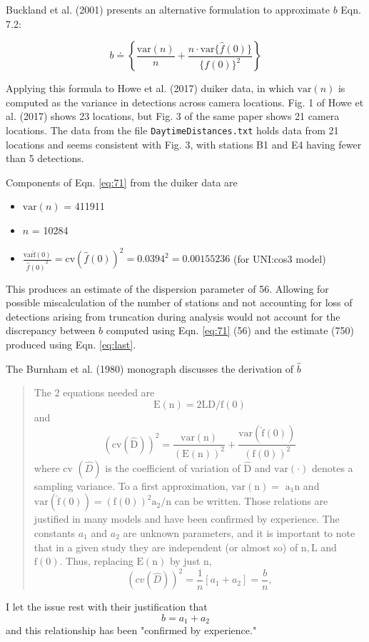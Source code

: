 \documentclass[10pt,a4paper]{article}
\begin{document}
Buckland et al. (2001) presents an alternative formulation to approximate $b$ Eqn. 7.2:

\begin{equation}
\label{eq:71}
b \doteq\left\{\frac{\mathrm{var}(n)}{n}+\frac{n \cdot \mathrm{var}\{\hat{f}(0)\}}{\{f(0)\}^{2}}\right\}
\end{equation}

Applying this formula to Howe et al. (2017) duiker data, in which $\mathrm{var}(n)$ is computed as the variance in detections across camera locations.  Fig. 1 of Howe et al. (2017) shows 23 locations, but Fig. 3 of the same paper shows 21 camera locations.  The data from the file \texttt{DaytimeDistances.txt} holds data from 21 locations and seems consistent with Fig. 3, with stations B1 and E4 having fewer than 5 detections.

Components of Eqn. \ref{eq:71} from the duiker data are
\begin{itemize}
	\item $\mathrm{var}(n)$ = 411911
	\item $n$ = 10284
	\item $\frac{\mathrm{var{\hat{f}(0)}}}{{\hat{f}(0)}^2} = \mathrm{cv}(\hat{f}(0))^2 = 0.0394^2 = 0.00155236$ (for UNI:cos3 model)
\end{itemize}

This produces an estimate of the dispersion parameter of 56.  Allowing for possible miscalculation of the number of stations and not accounting for loss of detections arising from truncation during analysis would not account for the discrepancy between $\hat{b}$ computed using Eqn. \ref{eq:71} (56) and the estimate (750) produced using Eqn. \ref{eq:last}.

The Burnham et al. (1980) monograph discusses the derivation of $\hat{b}$

\begin{quotation}
The 2 equations needed are
$$
\mathrm{E}(\mathrm{n})=2 \mathrm{LD} / \mathrm{f}(0)
$$
and
$$
(\mathrm{cv}(\hat{\mathrm{D}}))^{2}=\frac{\mathrm{var}(\mathrm{n})}{(\mathrm{E}(\mathrm{n}))^{2}}+\frac{\mathrm{var}(\hat{\mathrm{f}}(0))}{(\mathrm{f}(0))^{2}}
$$
where cv $(\hat{D})$ is the coefficient of variation of $\hat{\mathrm{D}}$ and $\mathrm{var}(\cdot)$ denotes a sampling variance. To a first approximation, $\mathrm{var}(\mathrm{n})=$ $\mathrm{a}_{1} \mathrm{n}$ and $\mathrm{var}(\hat{\mathrm{f}}(0))=(\mathrm{f}(0))^{2} \mathrm{a}_{2} / \mathrm{n}$ can be written. Those relations are justified in many models and have been confirmed by experience. The constants $a_{1}$ and $a_{2}$ are unknown parameters, and it is important to note that in a given study they are independent (or almost so) of $\mathrm{n}, \mathrm{L}$ and $\mathrm{f}(0)$. Thus, replacing $\mathrm{E}(\mathrm{n})$ by just $\mathrm{n}$,
$$
(cv(\hat{D}))^{2}=\frac{1}{n}\left[a_{1}+a_{2}\right]=\frac{b}{n},
$$
\end{quotation}
I let the issue rest with their justification that
$$
b = a_1 + a_2 
$$
and this relationship has been "confirmed by experience."
\end{document}
